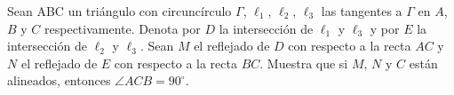 Sean ABC un triángulo con circuncírculo $\Gamma$, $\ell_1$, $\ell_2$, $\ell_3$ las tangentes a $\Gamma$ en $A$, $B$ y $C$ respectivamente. Denota por $D$ la intersección de $\ell_1$ y $\ell_3$ y por $E$ la intersección de $\ell_2$ y $\ell_3$. Sean $M$ el reflejado de $D$ con respecto a la recta $AC$ y $N$ el reflejado de $E$ con respecto a la recta $BC$. Muestra que si $M$, $N$ y $C$ están alineados, entonces $\angle ACB = 90^\circ$.